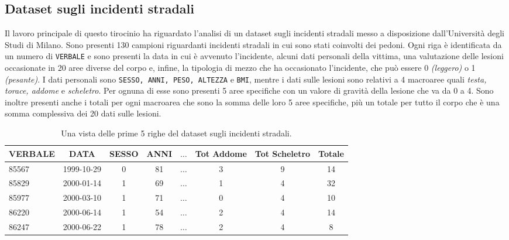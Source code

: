 \documentclass[12pt, twoside, letterpaper]{report}
\begin{document}
			
		\subsection{Dataset sugli incidenti stradali} \label{sec:incidenti}
			Il lavoro principale di questo tirocinio ha riguardato l'analisi di un dataset sugli incidenti stradali messo a disposizione dall'Università degli Studi di Milano. Sono presenti 130 campioni riguardanti incidenti stradali in cui sono stati coinvolti dei pedoni. Ogni riga è identificata da un numero di \texttt{VERBALE} e sono presenti la data in cui è avvenuto l'incidente, alcuni dati personali della vittima, una valutazione delle lesioni occasionate in 20 aree diverse del corpo e, infine, la tipologia di mezzo che ha occasionato l'incidente, che può essere 0 \textit{(leggero)} o 1 \textit{(pesante)}. I dati personali sono \texttt{SESSO, ANNI, PESO, ALTEZZA} e \texttt{BMI}, mentre i dati sulle lesioni sono relativi a 4 macroaree quali \textit{testa, torace, addome} e \textit{scheletro}. Per ognuna di esse sono presenti 5 aree specifiche con un valore di gravità della lesione che va da 0 a 4. Sono inoltre presenti anche i totali per ogni macroarea che sono la somma delle loro 5 aree specifiche, più un totale per tutto il corpo che è una somma complessiva dei 20 dati sulle lesioni. 
			\begin{table}[h]
			\begin{tabular}{lccccccc}
			\toprule
			VERBALE & DATA &  SESSO &  ANNI & $\dots$ &  Tot Addome &  Tot Scheletro &  Totale \\
			\midrule
			85567 & 1999-10-29 &      0 &    81 &  $\dots$ &         3 &              9 &      14 \\
			85829 & 2000-01-14 &      1 &    69 &  $\dots$ &         1 &              4 &      32 \\
			85977 & 2000-03-10 &      1 &    71 &  $\dots$ &         0 &              4 &      10 \\
			86220 & 2000-06-14 &      1 &    54 &  $\dots$ &         2 &              4 &      14 \\
			86247 & 2000-06-22 &      1 &    78 &  $\dots$ &         2 &              4 &       8 \\
			\bottomrule
			\end{tabular}
			\caption{\label{tab:incidenti}Una vista delle prime 5 righe del dataset sugli incidenti stradali.}
			\end{table}
			
\end{document}
